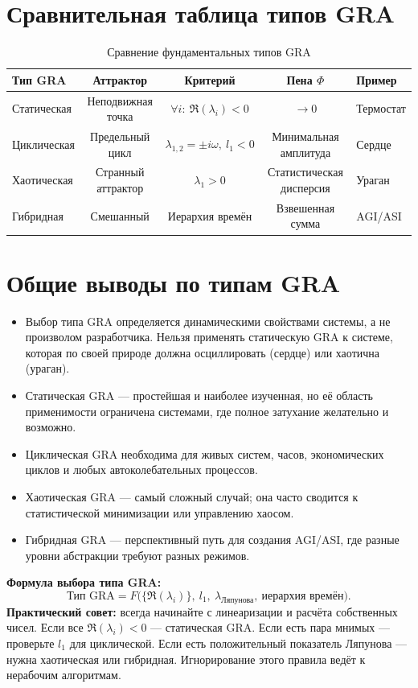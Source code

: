 \documentclass[12pt,a4paper]{article}
\begin{document}
\section{Сравнительная таблица типов GRA}

\begin{table}[h!]
\centering
\caption{Сравнение фундаментальных типов GRA}
\label{tab:comparison}
\begin{tabular}{@{}lccc>{\raggedright}p{3cm}@{}}
\toprule
Тип GRA & Аттрактор & Критерий & Пена $\Phi$ & Пример \\
\midrule
Статическая & Неподвижная точка & $\forall i:\ \Re(\lambda_i)<0$ & $\to 0$ & Термостат \\
Циклическая & Предельный цикл & $\lambda_{1,2}=\pm i\omega,\ l_1<0$ & Минимальная амплитуда & Сердце \\
Хаотическая & Странный аттрактор & $\lambda_1>0$ & Статистическая дисперсия & Ураган \\
Гибридная & Смешанный & Иерархия времён & Взвешенная сумма & AGI/ASI \\
\bottomrule
\end{tabular}
\end{table}

\section{Общие выводы по типам GRA}

\begin{itemize}
    \item Выбор типа GRA определяется динамическими свойствами системы, а не произволом разработчика. Нельзя применять статическую GRA к системе, которая по своей природе должна осциллировать (сердце) или хаотична (ураган).
    \item Статическая GRA — простейшая и наиболее изученная, но её область применимости ограничена системами, где полное затухание желательно и возможно.
    \item Циклическая GRA необходима для живых систем, часов, экономических циклов и любых автоколебательных процессов.
    \item Хаотическая GRA — самый сложный случай; она часто сводится к статистической минимизации или управлению хаосом.
    \item Гибридная GRA — перспективный путь для создания AGI/ASI, где разные уровни абстракции требуют разных режимов.
\end{itemize}

\textbf{Формула выбора типа GRA:}
\begin{equation}
    \text{Тип GRA} = F\bigl( \{\Re(\lambda_i)\},\ l_1,\ \lambda_{\text{Ляпунова}},\ \text{иерархия времён} \bigr).
\end{equation}
\textbf{Практический совет:} всегда начинайте с линеаризации и расчёта собственных чисел. Если все $\Re(\lambda_i)<0$ — статическая GRA. Если есть пара мнимых — проверьте $l_1$ для циклической. Если есть положительный показатель Ляпунова — нужна хаотическая или гибридная. Игнорирование этого правила ведёт к нерабочим алгоритмам.
\end{document}
